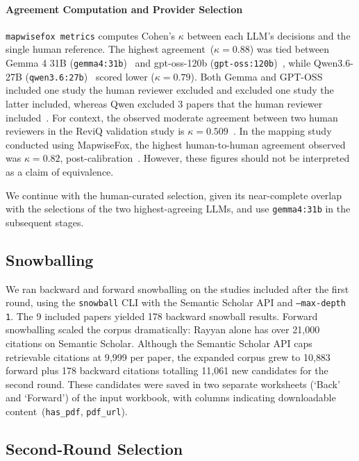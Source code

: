 \documentclass[preprint,12pt, a4paper]{elsarticle}
\begin{document}
\paragraph{Agreement Computation and Provider Selection}\label{sec:agreement}
\texttt{mapwisefox metrics} computes Cohen's $\kappa$ between each LLM's
decisions and the single human reference. The highest agreement~($\kappa=0.88$)
was tied between Gemma 4 31B (\texttt{gemma4:31b})~\cite{gemma} and gpt-oss-120b
(\texttt{gpt-oss:120b})~\cite{gptoss}, while Qwen3.6-27B
(\texttt{qwen3.6:27b})~\cite{qwen3} scored lower ($\kappa=0.79$). Both Gemma and GPT-OSS
included one study the human reviewer excluded and excluded one study the latter
included, whereas Qwen excluded 3 papers that the human reviewer
included~\cite{olar2026-config-examples}. For context, the observed
moderate agreement between two human reviewers in the ReviQ validation study is
$\kappa = 0.509$~\cite{reviq2026}. In the mapping study conducted using MapwiseFox,
the highest human-to-human agreement observed was $\kappa = 0.82$,
post-calibration~\cite{olar2026sms}. However, these figures should not be interpreted
as a claim of equivalence.

We continue with the human-curated selection, given its near-complete overlap with the
selections of the two highest-agreeing LLMs, and use \texttt{gemma4:31b} in the
subsequent stages.

\subsection{Snowballing}

We ran backward and forward snowballing on the studies included after the
first round, using the \texttt{snowball} CLI with the Semantic Scholar API
and \texttt{--max-depth 1}. The 9 included papers yielded 178 backward
snowball results. Forward snowballing scaled the corpus dramatically:
Rayyan alone has over 21{,}000 citations on Semantic Scholar. Although the Semantic
Scholar API caps retrievable citations at 9{,}999 per paper, the expanded
corpus grew to 10{,}883 forward plus 178 backward citations totalling 11{,}061 new
candidates for the second round. These candidates were saved in two separate
worksheets (`Back' and `Forward') of the input workbook, with columns indicating
downloadable content~(\texttt{has\_pdf}, \texttt{pdf\_url}).

\subsection{Second-Round Selection}
\end{document}
